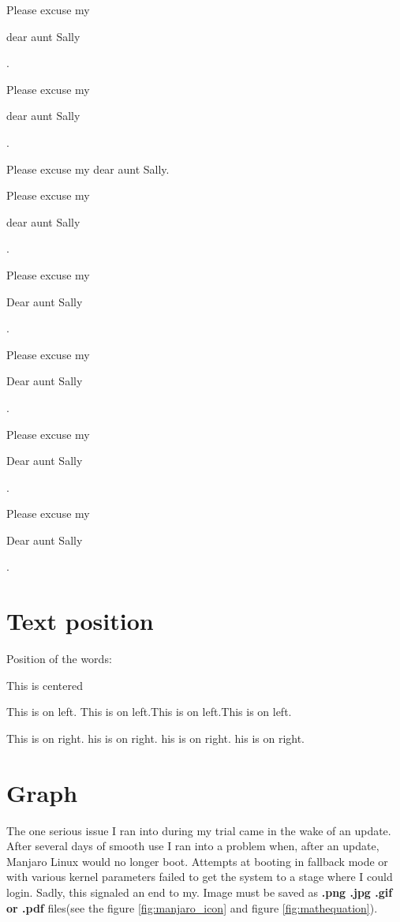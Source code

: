 \documentclass[11pt]{article}
\theoremstyle{definition}
\begin{document}
Please excuse my \begin{tiny} dear aunt Sally \end{tiny} .

Please excuse my \begin{small} dear aunt Sally \end{small} .

Please excuse my dear aunt Sally.

Please excuse my \begin{large} dear aunt Sally \end{large} .

Please excuse my \begin{Large} Dear aunt Sally \end{Large}.

Please excuse my \begin{LARGE} Dear aunt Sally \end{LARGE}.

Please excuse my \begin{huge} Dear aunt Sally \end{huge}.

Please excuse my \begin{Huge} Dear aunt Sally \end{Huge}.


\section{Text position}
Position of the words:

\begin{center} This is centered \end{center}

\begin{flushleft} This is on left. This is on left.This is on left.This is on left.\end{flushleft}

\begin{flushright} This is on right. his is on right. his is on right. his is on right. \end{flushright}


\section{Graph}
The one serious issue I ran into during my trial came in the wake of an update. After several days of smooth use I ran into a problem when, after an update, Manjaro Linux would no longer boot. Attempts at booting in fallback mode or with various kernel parameters failed to get the system to a stage where I could login. Sadly, this signaled an end to my. Image must be saved as \textbf{.png .jpg .gif or .pdf} files(see the figure \ref{fig:manjaro_icon} and figure \ref{fig:mathequation}).
\end{document}
